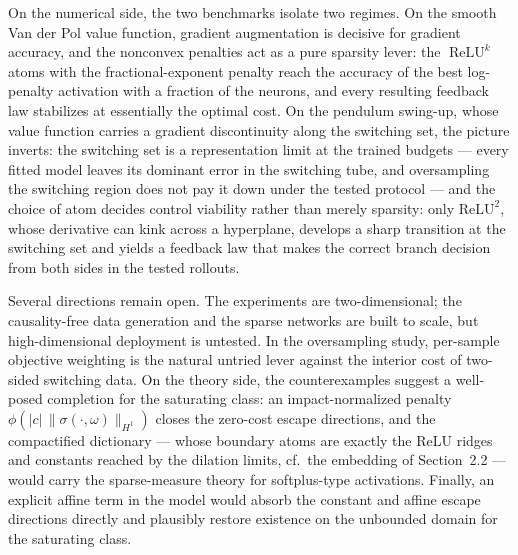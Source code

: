 \documentclass[11pt]{amsart}
\theoremstyle{definition}
\theoremstyle{remark}
\DeclareMathOperator{\relu}{ReLU}
\newcommand{\reluk}{\relu^{k}}
\begin{document}
On the numerical side, the two benchmarks isolate two regimes. On the smooth
Van der Pol value function, gradient augmentation is decisive for gradient
accuracy, and the nonconvex penalties act as a pure sparsity lever: the
$\reluk$ atoms with the fractional-exponent penalty reach the accuracy of the
best log-penalty activation with a fraction of the neurons, and every
resulting feedback law stabilizes at essentially the optimal cost. On the
pendulum swing-up, whose value function carries a gradient discontinuity
along the switching set, the picture inverts: the switching set is a
representation limit at the trained budgets --- every fitted model leaves its
dominant error in the switching tube, and oversampling the switching region
does not pay it down under the tested protocol --- and the choice of atom
decides control viability rather than merely sparsity: only
$\mathrm{ReLU}^2$, whose derivative can kink across a hyperplane, develops a
sharp transition at the switching set and yields a feedback law that makes
the correct branch decision from both sides in the tested rollouts.

Several directions remain open. The experiments are two-dimensional; the
causality-free data generation and the sparse networks are built to scale,
but high-dimensional deployment is untested. In the oversampling study,
per-sample objective weighting is the natural untried lever against the
interior cost of two-sided switching data. On the theory side, the
counterexamples suggest a well-posed completion for the saturating class: an
impact-normalized penalty $\phi(|c|\,\|\sigma(\cdot,\omega)\|_{H^1})$ closes
the zero-cost escape directions, and the compactified dictionary --- whose
boundary atoms are exactly the ReLU ridges and constants reached by the
dilation limits, cf.\ the embedding of Section~2.2 --- would carry the
sparse-measure theory for softplus-type activations. Finally, an explicit
affine term in the model would absorb the constant and affine escape directions
directly and plausibly restore existence on the unbounded domain for the
saturating class.

\newpage


\end{document}
